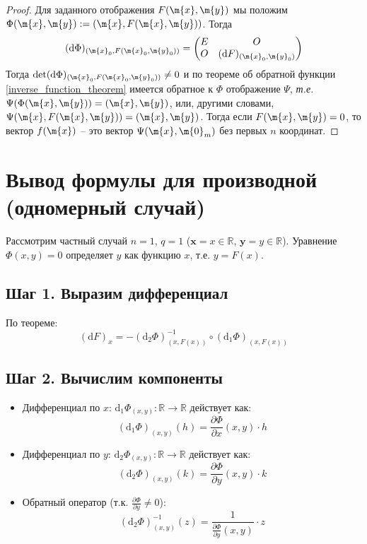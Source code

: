 \begin{proof}
    Для заданного отображения $F(\m{x},\m{y})$ мы положим $\Phi(\m{x},\m{y}):=(\m{x}, F(\m{x},\m{y}))$. Тогда 
    \[
     (\mathrm{d}\Phi)_{(\m{x}_0, F(\m{x}_0, \m{y}_0))} = \begin{pmatrix}
         E & O \\
         O & (\mathrm{d}F)_{(\m{x}_0,\m{y}_0)}
     \end{pmatrix}
    \]
Тогда $\mathrm{det} (\mathrm{d}\Phi)_{(\m{x}_0, F(\m{x}_0, \m{y}_0))} \ne 0$ и по теореме об обратной функции \ref{inverse_function_theorem} имеется обратное к $\Phi$ отображение $\Psi$, \textit{т.е.} $\Psi(\Phi(\m{x},\m{y})) = (\m{x},\m{y})$, или, другими словами, $\Psi(\m{x}, F(\m{x},\m{y})) = (\m{x},\m{y})$. Тогда если $F(\m{x},\m{y})=0$, то вектор $f(\m{x})$ -- это вектор $\Psi(\m{x}, \m{0}_m)$ без первых $n$ координат.
\end{proof}

\section*{Вывод формулы для производной (одномерный случай)}

Рассмотрим частный случай $n=1$, $q=1$ ($\mathbf{x} = x \in \mathbb{R}$, $\mathbf{y} = y \in \mathbb{R}$). Уравнение $\Phi(x,y) = 0$ определяет $y$ как функцию $x$, т.е. $y = F(x)$.

\subsection*{Шаг 1. Выразим дифференциал}
По теореме:
\begin{equation}
(\mathrm{d}F)_{x} = - \left( \mathrm{d}_2 \Phi \right)^{-1}_{(x, F(x))} \circ (\mathrm{d}_1 \Phi)_{(x, F(x))}
\label{eq:diff}
\end{equation}

\subsection*{Шаг 2. Вычислим компоненты}
\begin{itemize}
\item Дифференциал по $x$: $\mathrm{d}_1 \Phi_{(x,y)} : \mathbb{R} \to \mathbb{R}$ действует как:
\[
(\mathrm{d}_1 \Phi)_{(x,y)}(h) = \frac{\partial \Phi}{\partial x}(x,y) \cdot h
\]

\item Дифференциал по $y$: $\mathrm{d}_2 \Phi_{(x,y)} : \mathbb{R} \to \mathbb{R}$ действует как:
\[
(\mathrm{d}_2 \Phi)_{(x,y)}(k) = \frac{\partial \Phi}{\partial y}(x,y) \cdot k
\]

\item Обратный оператор (т.к. $\frac{\partial \Phi}{\partial y} \neq 0$):
\[
\left( \mathrm{d}_2 \Phi \right)^{-1}_{(x,y)}(z) = \frac{1}{\frac{\partial \Phi}{\partial y}(x,y)} \cdot z
\]
\end{itemize}

